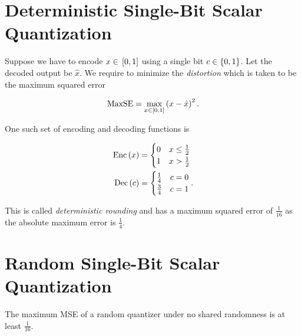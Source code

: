\documentclass[twoside]{article}
\begin{document}



\section{Deterministic Single-Bit Scalar Quantization}

Suppose we have to encode \(x\in{}\left[0,1\right]\) using a single bit \(c\in\left\{0,1\right\}\). Let the decoded output be \(\hat{x}\). We require to minimize the \emph{distortion} which is taken to be the maximum squared error

\begin{equation}
    \mathrm{MaxSE} = \max_{x\in{}\left[0,1\right]}\left(x-\hat{x}\right)^2.
    \label{eq:max-se}
\end{equation}

One such set of encoding and decoding functions is

\begin{align}
    \mathrm{Enc}\left(x\right) &= 
    \begin{cases}
        0 & x \le \frac{1}{2} \\
        1 & x > \frac{1}{2}
    \end{cases}
    \label{eq:det-rd-enc} \\
    \mathrm{Dec}\left(c\right) &= 
    \begin{cases}
        \frac{1}{4} & c = 0 \\
        \frac{3}{4} & c = 1
    \end{cases}.
    \label{eq:det-rd-dec}
\end{align}

This is called \emph{deterministic rounding} and has a maximum squared error of \(\frac{1}{16}\) as the absolute maximum error is \(\frac{1}{4}\).

\section{Random Single-Bit Scalar Quantization}

\begin{claim}
    The maximum MSE of a random quantizer under no shared randomness is at least \(\frac{1}{16}\).
\end{claim}
\end{document}
